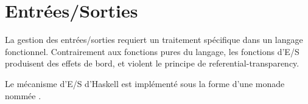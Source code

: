\part{Entrées/Sorties}

\begin{introduction}
La gestion des entrées/sorties requiert un traitement spécifique dans un langage fonctionnel. Contrairement aux fonctions pures du langage, les fonctions d'E/S produisent des effets de bord, et violent le principe de \gls{referential-transparency}.

Le mécanisme d'E/S d'Haskell est implémenté sous la forme d'une monade  nommée .
\end{introduction}
